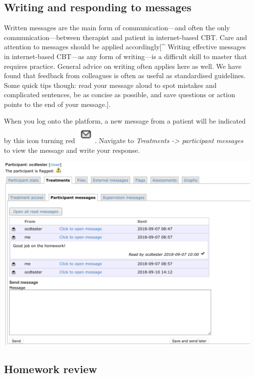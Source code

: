 \documentclass[]{book}
\theoremstyle{definition}
\theoremstyle{definition}
\theoremstyle{definition}
\theoremstyle{remark}
\begin{document}
\hypertarget{writing-and-responding-to-messages}{%
\subsection{Writing and responding to
messages}\label{writing-and-responding-to-messages}}

Written messages are the main form of communication---and often the only
communication---between therapist and patient in internet-based CBT.
Care and attention to messages should be applied accordingly{[}\^{}
Writing effective messages in internet-based CBT---as any form of
writing---is a difficult skill to master that requires practice. General
advice on writing often applies here as well. We have found that
feedback from colleagues is often as useful as standardised guidelines.
Some quick tips though: read your message aloud to spot mistakes and
complicated sentences, be as concise as possible, and save questions or
action points to the end of your message.{]}.

When you log onto the platform, a new message from a patient will be
indicated by this icon turning red
\includegraphics{images/message-icon.png}. Navigate to \emph{Treatments
-\textgreater{} participant messages} to view the message and write your
response.

\includegraphics{images/therapist-messages.png}

\hypertarget{homework-review}{%
\subsection{Homework review}\label{homework-review}}
\end{document}
